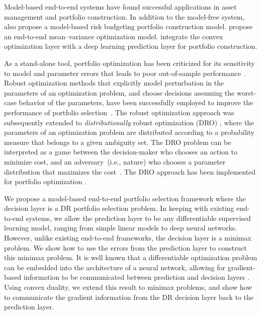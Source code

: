 \documentclass[10pt, twocolumn]{article}
\theoremstyle{plain}
\theoremstyle{definition}
\begin{document}
Model-based end-to-end systems have found successful applications in asset
management and portfolio construction. In addition to the model-free system,
\citet{uysal2021end} also propose a model-based risk budgeting
portfolio construction model. \citet{butler2021integrating} propose an
end-to-end mean--variance optimization model. \citet{zhang2021universal}
integrate the convex optimization layer with a deep learning prediction
layer for portfolio construction. 

As a stand-alone tool, portfolio optimization has been criticized for its
sensitivity to model and parameter errors that leads to poor out-of-sample
performance~\citep{merton1980estimating, best1991sensitivity, chopra1993,
broadie1993computing}. Robust optimization methods that explicitly model
perturbation in the parameters of an optimization problem, and choose
decisions assuming the worst-case behavior of the parameters, have been
successfully employed to improve the performance of portfolio
selection~\citep[e.g., see][]{goldfarb2003robust, tutuncu2004robust,
fabozzi2007robust, costa2020robust}. The robust optimization approach
was subsequently extended to \emph{distributionally} robust optimization (DRO)
\citep{scarf1958min, delage2010distributionally, ben2013robust}, where the
parameters of an optimization problem are distributed according to a 
probability measure that belongs to a given ambiguity set. The DRO problem can 
be interpreted as a game between the decision-maker who chooses an action to
minimize cost, and an adversary~(i.e., nature) who chooses a
parameter distribution that maximizes the cost~\citep{neumann1928theorie}. 
The DRO approach has been implemented for portfolio optimization 
\citep[e.g., see][]{calafiore2007ambiguous, delage2010distributionally, 
costa2021datadriven}.  

We propose a model-based end-to-end portfolio selection framework where
the decision layer is %
a DR portfolio selection problem. In
keeping with existing end-to-end systems, we allow the prediction layer to
be any differentiable supervised learning model, ranging from simple
linear models to deep neural networks. However, unlike existing end-to-end
frameworks, the decision layer is a minimax problem. We show how to use
the errors from the prediction layer to construct this minimax problem. It
is well known that a differentiable optimization problem can be embedded
into the architecture of a neural network, allowing for gradient-based
information to be communicated between prediction and decision layers
\citep{amos2017optnet, donti2017task, agrawal2019differentiable, 
amos2019differentiable}. Using convex duality, we extend this result to minimax
problems, and show how to communicate the gradient information from the DR
decision layer back to the prediction layer.  
\end{document}
